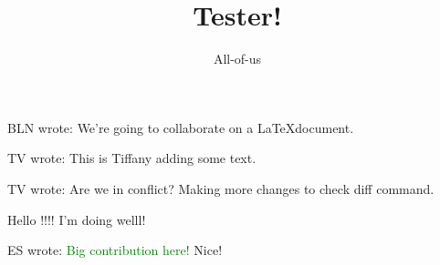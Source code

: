 \documentclass[12pt]{article}
\title{Tester!}
\author{All-of-us}
\newcommand{\bln}[1]{BLN wrote: \textcolor{red!70!blue!70}{#1}}
\newcommand{\tv}[1]{TV wrote: \textcolor{blue!70}{#1}}
\newcommand{\es}[1]{ES wrote: \textcolor{green}{#1}}
\begin{document}
\maketitle

\bln{We're going to collaborate on a \LaTeX document.}

\tv{This is Tiffany adding some text.}

\tv{Are we in conflict? Making more changes to check diff command.}

Hello !!!! I'm doing welll!

\es{Big contribution here!}
{Nice!}
\end{document}
